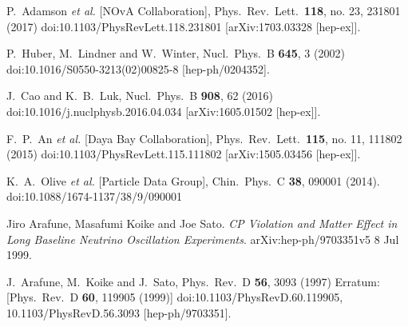 \documentclass[a4 paper,12pt]{report}%
\begin{document}
\begin{thebibliography}{9}
 
 
  P.~Adamson {\it et al.} [NOvA Collaboration],
  Phys.\ Rev.\ Lett.\  {\bf 118}, no. 23, 231801 (2017)
  doi:10.1103/PhysRevLett.118.231801
  [arXiv:1703.03328 [hep-ex]].



  P.~Huber, M.~Lindner and W.~Winter,
  Nucl.\ Phys.\ B {\bf 645}, 3 (2002)
  doi:10.1016/S0550-3213(02)00825-8
  [hep-ph/0204352].
  
  J.~Cao and K.~B.~Luk,
  Nucl.\ Phys.\ B {\bf 908}, 62 (2016)
  doi:10.1016/j.nuclphysb.2016.04.034
  [arXiv:1605.01502 [hep-ex]].
  
  F.~P.~An {\it et al.} [Daya Bay Collaboration],
  Phys.\ Rev.\ Lett.\  {\bf 115}, no. 11, 111802 (2015)
  doi:10.1103/PhysRevLett.115.111802
  [arXiv:1505.03456 [hep-ex]].





  K.~A.~Olive {\it et al.} [Particle Data Group],
  Chin.\ Phys.\ C {\bf 38}, 090001 (2014).
  doi:10.1088/1674-1137/38/9/090001



 \label{a6}
Jiro Arafune, Masafumi Koike and Joe Sato.  
\textit{CP Violation and Matter Effect in Long Baseline Neutrino Oscillation Experiments}. 
arXiv:hep-ph/9703351v5 8 Jul 1999.

  J.~Arafune, M.~Koike and J.~Sato,
  Phys.\ Rev.\ D {\bf 56}, 3093 (1997)
  Erratum: [Phys.\ Rev.\ D {\bf 60}, 119905 (1999)]
  doi:10.1103/PhysRevD.60.119905, 10.1103/PhysRevD.56.3093
  [hep-ph/9703351].


\end{thebibliography}
\end{document}
